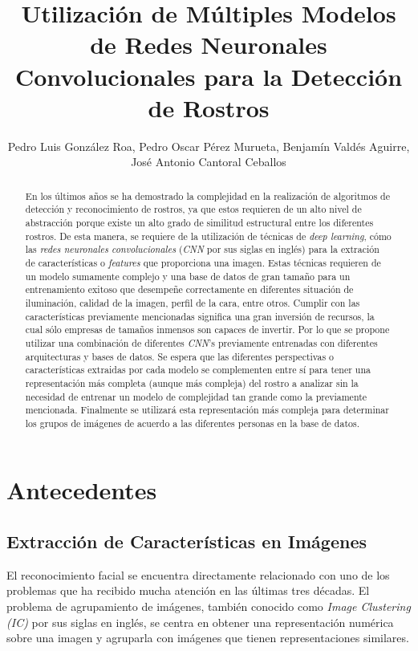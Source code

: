 \documentclass[letterpaper, 10 pt, conference]{ieeeconf}  %
\title{\LARGE \bf
    Utilización de Múltiples Modelos de Redes Neuronales Convolucionales
    para la Detección de Rostros
}
\author{Pedro Luis González Roa, Pedro Oscar Pérez Murueta, Benjamín Valdés Aguirre,
José Antonio Cantoral Ceballos}
\begin{document}
    \maketitle
    \thispagestyle{empty}
    \pagestyle{empty}

    \begin{abstract}
        En los últimos años se ha demostrado la complejidad en la realización de
        algoritmos de detección y reconocimiento de rostros, ya que estos requieren de un alto
        nivel de abstracción porque existe un alto grado de similitud estructural entre los
        diferentes rostros. De esta manera, se requiere de la utilización de técnicas de
        \textit{deep learning}, cómo las \textit{redes neuronales convolucionales} (\textit{CNN}
        por sus siglas en inglés) para la extración de características o \textit{features} que 
        proporciona una imagen.  Estas técnicas requieren de un modelo sumamente complejo y una
        base de datos de gran tamaño para un entrenamiento exitoso que desempeñe correctamente en
        diferentes situación de iluminación, calidad de la imagen, perfil de la cara, entre otros.
        Cumplir con las características previamente mencionadas significa una gran inversión de
        recursos, la cual sólo empresas de tamaños inmensos son capaces de invertir.
        Por lo que se propone utilizar una combinación de diferentes \textit{CNN}'s previamente
        entrenadas con diferentes arquitecturas y bases de datos.
        Se espera que las diferentes perspectivas o características extraidas por cada modelo
        se complementen entre sí para tener una representación más completa (aunque
        más compleja) del rostro a analizar sin la necesidad de entrenar un modelo de complejidad
        tan grande como la previamente mencionada. Finalmente se utilizará esta representación
        más compleja para determinar los grupos de imágenes de acuerdo a las diferentes personas
        en la base de datos.
    \end{abstract}

    \section{Antecedentes}

    \subsection{Extracción de Características en Imágenes}
    El reconocimiento facial se encuentra directamente relacionado con uno de los
    problemas que ha recibido mucha atención en las últimas tres décadas. El problema
    de agrupamiento de imágenes, también conocido como \textit{Image Clustering (IC)}
    por sus siglas en inglés, se centra en obtener una representación numérica sobre
    una imagen y agruparla con imágenes que tienen representaciones similares.
    \cite{CombiningCNN}
\end{document}
